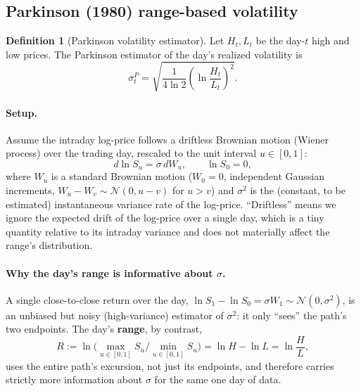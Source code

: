 \documentclass[11pt]{article}
\theoremstyle{definition}
\newtheorem{definition}[theorem]{Definition}
\theoremstyle{remark}
\begin{document}
\subsection{Parkinson (1980) range-based volatility}
\label{sec:parkinson}

\begin{definition}[Parkinson volatility estimator]
Let $H_t,L_t$ be the day-$t$ high and low prices. The Parkinson estimator of the day's realized volatility is
\[
\sigma^{P}_t = \sqrt{\frac{1}{4\ln 2}\left(\ln\frac{H_t}{L_t}\right)^2}.
\]
\end{definition}

\paragraph{Setup.} Assume the intraday log-price follows a driftless Brownian motion (Wiener process) over the trading day, rescaled to the unit interval $u\in[0,1]$:
\[
d\ln S_u = \sigma\,dW_u, \qquad \ln S_0 = 0,
\]
where $W_u$ is a standard Brownian motion ($W_0=0$, independent Gaussian increments, $W_u-W_v\sim\mathcal N(0,u-v)$ for $u>v$) and $\sigma^2$ is the (constant, to be estimated) instantaneous variance rate of the log-price. ``Driftless'' means we ignore the expected drift of the log-price over a single day, which is a tiny quantity relative to its intraday variance and does not materially affect the range's distribution.

\paragraph{Why the day's range is informative about $\sigma$.} A single close-to-close return over the day, $\ln S_1-\ln S_0=\sigma W_1\sim\mathcal N(0,\sigma^2)$, is an unbiased but noisy (high-variance) estimator of $\sigma^2$: it only ``sees'' the path's two endpoints. The day's \textbf{range}, by contrast,
\[
R := \ln\!\Big(\max_{u\in[0,1]}S_u\Big/\min_{u\in[0,1]}S_u\Big) = \ln H-\ln L = \ln\frac{H}{L},
\]
uses the entire path's excursion, not just its endpoints, and therefore carries strictly more information about $\sigma$ for the same one day of data.
\end{document}
